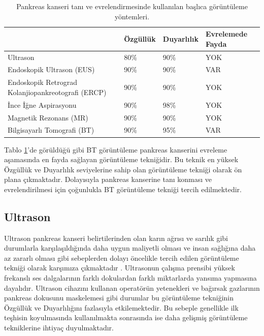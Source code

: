 \begin{table}[h!]	
	\caption{Pankreas kanseri tanı ve evrelendirmesinde kullanılan başlıca görüntüleme yöntemleri.\cite{goral2014pankreas}}
	\begin{tabular}{m{6cm}m{2.5cm}m{2.5cm}m{3cm}}
		& \textbf{Özgüllük} & \textbf{Duyarlılık} & \textbf{Evrelemede Fayda} \\ \hline
		Ultrason                                              & 80\%     & 90\%       & YOK                   \\ \hline
		Endoskopik Ultrason (EUS)                             & 90\%     & 90\%       & VAR                   \\ \hline
		Endoskopik Retrograd Kolanjiopankreotografi (ERCP) & 90\%     & 90\%       & YOK                   \\ \hline		
		İnce İğne Aspirasyonu                                 & 90\%     & 98\%       & YOK 
		\\ \hline
		Magnetik Rezonans (MR)                                & 90\%     & 90\%       & YOK                   \\ \hline
		\rowcolor{Gray}
		Bilgisayarlı Tomografi (BT)                           & 90\%     & 95\%       & VAR                                    
	\end{tabular}
	\label{tab:goruntulemeteknikleri}
\end{table} 

Tablo \ref{tab:goruntulemeteknikleri}'de görüldüğü gibi BT görüntüleme pankreas kanserini evreleme aşamasında en fayda sağlayan görüntüleme tekniğidir. Bu teknik en yüksek Özgüllük ve Duyarlılık seviyelerine sahip olan görüntüleme tekniği olarak ön plana çıkmaktadır. Dolayısıyla pankreas kanserine tanı konması ve evrelendirilmesi için çoğunlukla BT görüntüleme tekniği tercih edilmektedir.

\subsection{Ultrason}

Ultrason pankreas kanseri belirtilerinden olan karın ağrısı ve sarılık gibi durumlarla karşılaşıldığında daha uygun maliyetli olması ve insan sağlığına daha az zararlı olması gibi sebeplerden dolayı öncelikle tercih edilen görüntüleme tekniği olarak karşımıza çıkmaktadır \cite{wells2006ultrasound,chan2011basics,sofuni2005differential}. Ultrasonun çalışma prensibi yüksek frekanslı ses dalgalarının farklı dokulardan farklı miktarlarda yansıma yapmasına dayalıdır. Ultrason cihazını kullanan operatörün yetenekleri ve bağırsak gazlarının pankreas dokusunu maskelemesi gibi durumlar bu görüntüleme tekniğinin Özgüllük ve Duyarlılığını fazlasıyla etkilemektedir. Bu sebeple genellikle ilk teşhisin koyulmasında kullanılmakta sonrasında ise daha gelişmiş görüntüleme tekniklerine ihtiyaç duyulmaktadır.


